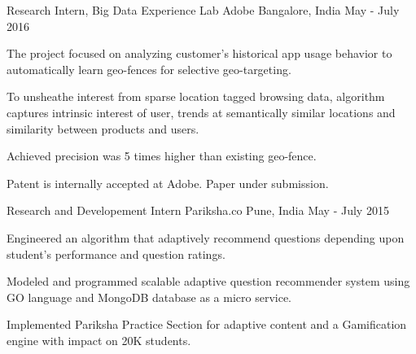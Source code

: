 

\begin{cventries}

  \cventry
    {Research Intern, Big Data Experience Lab} %
    {Adobe} %
    {Bangalore, India} %
    {May - July 2016} %
    {
      \begin{cvitems} %
        \item {The project focused on analyzing customer’s historical app usage behavior to automatically learn geo-fences for selective geo-targeting.}
        \item { To unsheathe interest from sparse location tagged browsing data, algorithm captures intrinsic interest of user, trends at semantically similar locations and similarity between products and users. }
        \item Achieved precision was 5 times higher than existing geo-fence. 
        \item Patent is internally accepted at Adobe. Paper under submission.
      \end{cvitems}
    }

  \cventry
    {Research and Developement Intern} %
    {Pariksha.co} %
    {Pune, India} %
    {May - July 2015} %
    {
      \begin{cvitems} 
      	\item {Engineered an algorithm that adaptively recommend questions depending upon student’s performance and question ratings.}
      	\item {Modeled and programmed scalable adaptive question recommender system using GO language and MongoDB database as a micro service.}
      	\item {Implemented Pariksha Practice Section for adaptive content and a Gamification engine with impact on 20K students.}
      \end{cvitems}
    }
\end{cventries}
